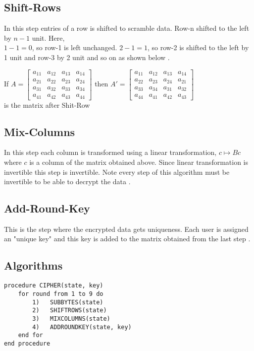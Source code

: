 \vspace{3mm}
\subsection{Shift-Rows}
In this step entries of a row is shifted to scramble data. Row-n shifted to the left by \(n-1\) unit. Here,\\
\(1-1=0\), so row-1 is left unchanged. \(2-1=1\), so row-2 is shifted to the left by 1 unit and row-3 by 2 unit and so on as shown below \cite{aes}.

\vspace{3mm}
If \(A=\begin{bmatrix}
    a_{11}&a_{12}&a_{13}&a_{14}\\
    a_{21}&a_{22}&a_{23}&a_{24}\\
    a_{31}&a_{32}&a_{33}&a_{34}\\
    a_{41}&a_{42}&a_{43}&a_{44}
    \end{bmatrix}\) \hspace{3mm} then \(A'=\begin{bmatrix}
    a_{11}&a_{12}&a_{13}&a_{14}\\
    a_{22}&a_{23}&a_{24}&a_{21}\\
    a_{33}&a_{34}&a_{31}&a_{32}\\
    a_{44}&a_{41}&a_{42}&a_{43}
    \end{bmatrix}\) \vspace{2mm} \\[3mm] is the matrix after Shit-Row

\subsection{Mix-Columns}
In this step each column is transformed using a linear transformation, \(c \mapsto Bc\) where \(c\) is a column of the matrix obtained above. Since linear transformation is invertible this step is invertible. Note every step of this algorithm must be invertible to be able to decrypt the data \cite{aes}.

\subsection{Add-Round-Key}
This is the step where the encrypted data gets uniqueness. Each user is assigned an "unique key" and this key is added to the matrix obtained from the last step \cite{aes}.

\subsection{Algorithms}
\begin{tcolorbox}[colback=gray!20, colframe=blue!30, left=2cm, boxsep=2mm, title={\small \bfseries \textcolor{black}{Encryption Algorithm}}, width=15cm]
\begin{verbatim}
procedure CIPHER(state, key)
    for round from 1 to 9 do
        1)   SUBBYTES(state)
        2)   SHIFTROWS(state)
        3)   MIXCOLUMNS(state)
        4)   ADDROUNDKEY(state, key)
    end for
end procedure
\end{verbatim} \cite{aes}
\end{tcolorbox}


